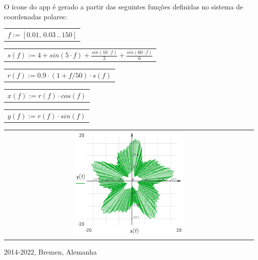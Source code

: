 \documentclass[DIV=calc, paper=a4, fontsize=11pt, twocolumn]{scrartcl}
\begin{document}
O ícone do app é gerado a partir das
seguintes funções definidas no sistema
de coordenadas polares:
\begin{center}\begin{tabular}{c}
                $f := \left[ 0.01,\, 0.03 \,..\, 150 \right]$
\end{tabular}\end{center}
\begin{center}\begin{tabular}{c}
                $s(f) := 4 + sin \left( 5 \cdot f\right)  + \frac{sin \left( 10 \cdot f\right) }{2} + \frac{sin \left( 60 \cdot f\right) }{6}$
\end{tabular}\end{center}
\begin{center}\begin{tabular}{c}
                $r(f) := 0.9 \cdot \left( 1 + f / 50 \right) \cdot s \left( f\right) $
\end{tabular}\end{center}
\begin{center}\begin{tabular}{c}
                $x(f) := r \left( f\right)  \cdot cos \left( f\right) $
\end{tabular}\end{center}
\begin{center}\begin{tabular}{c}
                $y(f) := r \left( f\right)  \cdot sin \left( f\right) $
\end{tabular}\end{center}
\begin{center}\begin{tabular}{c} \includegraphics[width=0.45\textwidth]{graphics/about_micromath_fig1.png} \end{tabular}\end{center}

2014-2022, Bremen, Alemanha
\end{document}
